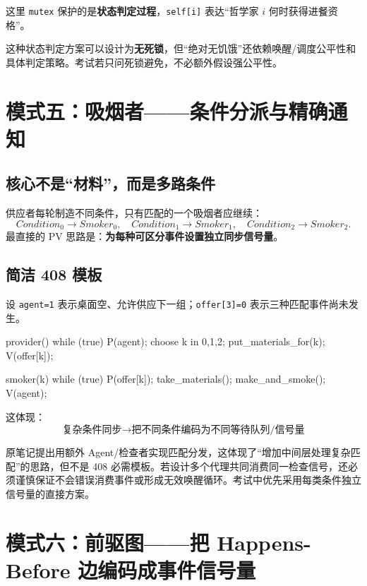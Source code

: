 \documentclass[11pt,a4paper]{ctexart}
\newcommand{\kw}[1]{\textbf{#1}}
\newcommand{\code}[1]{\texttt{#1}}
\begin{document}
这里 \code{mutex} 保护的是\kw{状态判定过程}，\code{self[i]} 表达“哲学家 $i$ 何时获得进餐资格”。

\begin{warn}[不要过度声称]
这种状态判定方案可以设计为\kw{无死锁}，但“绝对无饥饿”还依赖唤醒/调度公平性和具体判定策略。考试若只问死锁避免，不必额外假设强公平性。
\end{warn}

\section{模式五：吸烟者——条件分派与精确通知}

\subsection{核心不是“材料”，而是多路条件}

供应者每轮制造不同条件，只有匹配的一个吸烟者应继续：
\[
Condition_0\to Smoker_0,\quad
Condition_1\to Smoker_1,\quad
Condition_2\to Smoker_2.
\]
最直接的 PV 思路是：\kw{为每种可区分事件设置独立同步信号量}。

\subsection{简洁 408 模板}

设 \code{agent=1} 表示桌面空、允许供应下一组；\code{offer[3]=0} 表示三种匹配事件尚未发生。

\begin{codeblock}
provider() {
    while (true) {
        P(agent);
        choose k in {0,1,2};
        put_materials_for(k);
        V(offer[k]);
    }
}

smoker(k) {
    while (true) {
        P(offer[k]);
        take_materials();
        make_and_smoke();
        V(agent);
    }
}
\end{codeblock}

这体现：
\[
\boxed{\text{复杂条件同步}\to\text{把不同条件编码为不同等待队列/信号量}}
\]

\begin{eng}[关于“代理人模式”]
原笔记提出用额外 Agent/检查者实现匹配分发，这体现了“增加中间层处理复杂匹配”的思路，但不是 408 必需模板。若设计多个代理共同消费同一检查信号，还必须谨慎保证不会错误消费事件或形成无效唤醒循环。考试中优先采用每类条件独立信号量的直接方案。
\end{eng}

\section{模式六：前驱图——把 Happens-Before 边编码成事件信号量}
\end{document}

